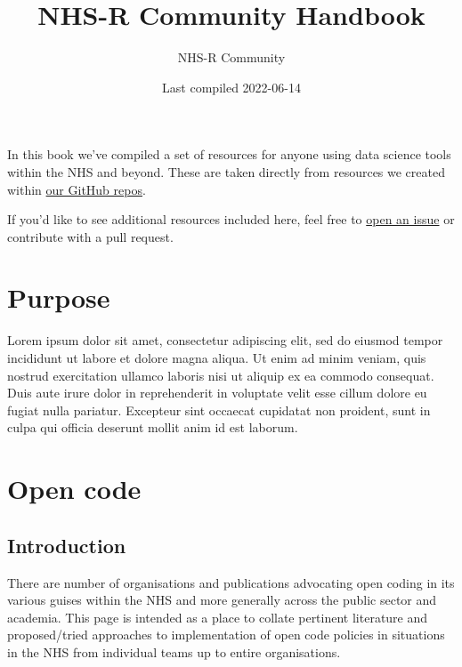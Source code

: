 \documentclass[
]{book}
\title{NHS-R Community Handbook}
\author{NHS-R Community}
\date{Last compiled 2022-06-14}
\begin{document}
\maketitle

{
\setcounter{tocdepth}{1}
\tableofcontents
}
\hypertarget{section}{%
\chapter*{}\label{section}}

In this book we've compiled a set of resources for anyone using data science tools within the NHS and beyond. These are taken directly from resources we created within \href{https://github.com/nhs-r-community}{our GitHub repos}.

If you'd like to see additional resources included here, feel free to \href{https://github.com/nhs-r-community/statements-on-tools/issues/}{open an issue} or contribute with a pull request.

\newpage

\hypertarget{purpose}{%
\chapter{Purpose}\label{purpose}}

Lorem ipsum dolor sit amet, consectetur adipiscing elit, sed do eiusmod tempor incididunt ut labore et dolore magna aliqua. Ut enim ad minim veniam, quis nostrud exercitation ullamco laboris nisi ut aliquip ex ea commodo consequat. Duis aute irure dolor in reprehenderit in voluptate velit esse cillum dolore eu fugiat nulla pariatur. Excepteur sint occaecat cupidatat non proident, sunt in culpa qui officia deserunt mollit anim id est laborum.

\newpage

\hypertarget{open-code}{%
\chapter{Open code}\label{open-code}}

\hypertarget{introduction}{%
\section{Introduction}\label{introduction}}

There are number of organisations and publications advocating open coding in its various guises within the NHS and more generally across the public sector and academia. This page is intended as a place to collate pertinent literature and proposed/tried approaches to implementation of open code policies in situations in the NHS from individual teams up to entire organisations.
\end{document}
